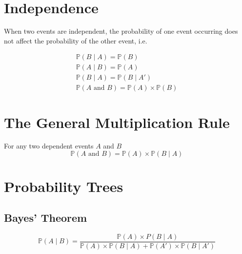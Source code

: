 \documentclass[12pt letter]{report}
\begin{document}

\section{Independence}

When two events are independent, the probability of one event occurring does not affect the probability of the other
event, i.e.

\begin{align*}
	\mathbb{P} \left( B  \mid  A \right) = \mathbb{P} \left( B \right)           \\
	\mathbb{P} \left( A  \mid B \right)  = \mathbb{P} \left( A \right)           \\
	\mathbb{P} \left( B  \mid A \right)  = \mathbb{P} \left( B  \mid A'  \right) \\
	\mathbb{P} \left( A \text{ and } B \right) = \mathbb{P} \left( A \right)  \times \mathbb{P} \left( B \right)
\end{align*}

\section{The General Multiplication Rule}

For any two dependent events $A$ and $B$
\[
	\mathbb{P} \left( A \text{ and } B \right) = \mathbb{P} \left( A \right) \times \mathbb{P} \left( B  \mid A \right)
\]

\section{Probability Trees}


\subsection{Bayes' Theorem}

\[
	\mathbb{P} \left( A  \mid B \right)  = \frac{\mathbb{P} \left( A \right) \times P \left( B  \mid A \right)   }{
		\mathbb{P} \left( A \right) \times \mathbb{P} \left( B  \mid A \right) + \mathbb{P} \left( A' \right) \times \mathbb{P}
		\left( B  \mid A' \right) }
\]
\end{document}
